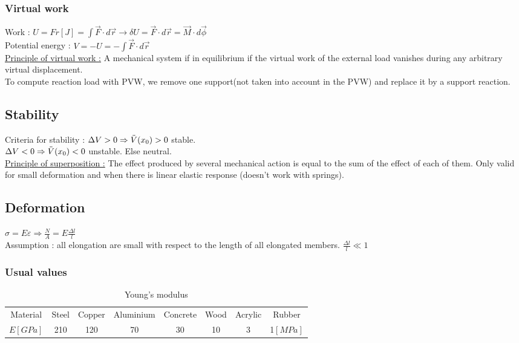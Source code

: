 \documentclass[../main.tex]{subfiles}
\begin{document}
\subsubsection{Virtual work}
Work : $U = Fr[J] = \int \vec{F} \cdot d\vec{r} \rightarrow \delta U = \vec{F}\cdot d\vec{r} = \vec{M} \cdot d\vec{\phi}$\\
Potential energy : $V = -U = -\int \vec{F}\cdot d\vec{r}$ \\


\quad \underline{Principle of virtual work :} A mechanical system if in equilibrium if the virtual work of the external load vanishes during any arbitrary virtual displacement.\\
To compute reaction load with PVW, we remove one support(not taken into account in the PVW) and replace it by a support reaction.\\

\subsection{Stability}
Criteria for stability : $\Delta V > 0 \Rightarrow \Ddot{V}(x_0) >0$ stable.\\
$\Delta V < 0 \Rightarrow \Ddot{V}(x_0) <0$ unstable. Else neutral.\\

\quad \underline{Principle of superposition :} The effect produced by several mechanical action is equal to the sum of the effect of each of them. Only valid for small deformation and when there is linear elastic response (doesn't work with springs).\\

\subsection{Deformation}
$\sigma = E \varepsilon \Rightarrow \frac{N}{A} = E \frac{\Delta l}{l}$\\
Assumption : all elongation are small with respect to the length of all elongated members. $\frac{\Delta l}{l} \ll 1$\\

\subsubsection{Usual values}
\begin{table}[hbt!]
    \centering
    \begin{tabular}{c||c|c|c|c|c|c|c}
        Material & Steel & Copper & Aluminium & Concrete & Wood & Acrylic & Rubber \\
        $E[GPa]$ & 210 & 120 & 70 & 30 & 10& 3 & 1$[MPa]$\\ 
    \end{tabular}
    \caption{Young's modulus}
    
\end{table}
\end{document}
